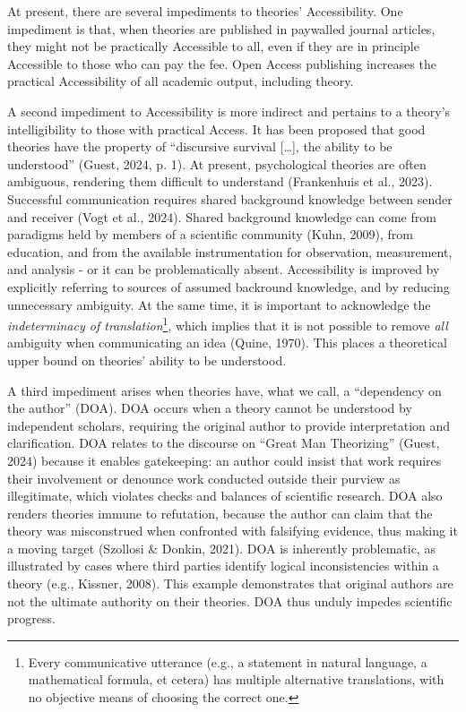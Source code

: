 \documentclass[
  man, noextraspace,floatsintext]{apa7}
\begin{document}
At present, there are several impediments to theories' Accessibility.
One impediment is that,
when theories are published in paywalled journal articles,
they might not be practically Accessible to all,
even if they are in principle Accessible to those who can pay the fee.
Open Access publishing increases the practical Accessibility of all academic output, including theory.

A second impediment to Accessibility is more indirect
and pertains to a theory's intelligibility to those with practical Access.
It has been proposed that good theories have the property of ``discursive survival {[}\ldots{]}, the ability to be understood'' (Guest, 2024, p. 1).
At present, psychological theories are often ambiguous, rendering them difficult to understand (Frankenhuis et al., 2023).
Successful communication requires shared background knowledge between sender and receiver (Vogt et al., 2024).
Shared background knowledge can come from paradigms held by members of a scientific community (Kuhn, 2009),
from education, and from the available instrumentation for observation, measurement, and analysis - or it can be problematically absent.
Accessibility is improved by explicitly referring to sources of assumed backround knowledge, and by reducing unnecessary ambiguity.
At the same time, it is important to acknowledge the \emph{indeterminacy of translation}\footnote{Every communicative utterance (e.g., a statement in natural language, a mathematical formula, et cetera)
  has multiple alternative translations, with no objective means of choosing the correct one.},
which implies that it is not possible to remove \emph{all} ambiguity when communicating an idea (Quine, 1970).
This places a theoretical upper bound on theories' ability to be understood.

A third impediment arises when theories have, what we call, a ``dependency on the author'' (DOA).
DOA occurs when a theory cannot be understood by independent scholars,
requiring the original author to provide interpretation and clarification.
DOA relates to the discourse on ``Great Man Theorizing'' (Guest, 2024) because it enables gatekeeping: an author could insist that work requires their involvement or denounce work conducted outside their purview as illegitimate,
which violates checks and balances of scientific research.
DOA also renders theories immune to refutation,
because the author can claim that the theory was misconstrued when confronted with falsifying evidence, thus making it a moving target (Szollosi \& Donkin, 2021).
DOA is inherently problematic, as illustrated by cases where third parties identify logical inconsistencies within a theory (e.g., Kissner, 2008).
This example demonstrates that original authors are not the ultimate authority on their theories.
DOA thus unduly impedes scientific progress.
\end{document}
